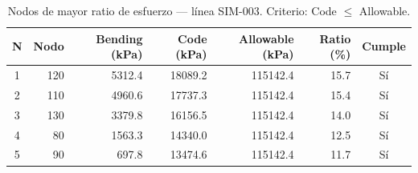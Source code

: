 \begin{table}[htbp]
  \centering
  \small
  \caption{Nodos de mayor ratio de esfuerzo — línea SIM-003. Criterio: Code $\leq$ Allowable.}
  \label{tab:top5-ratio}
  \begin{tabular}{crrrrrc}
    \toprule
    N & Nodo & Bending (\si{kPa}) & Code (\si{kPa}) & Allowable (\si{kPa}) & Ratio (\%) & Cumple \\
    \midrule
    1 & 120 & \num{5312.4} & \num{18089.2} & \num{115142.4} & 15.7 & Sí \\
    2 & 110 & \num{4960.6} & \num{17737.3} & \num{115142.4} & 15.4 & Sí \\
    3 & 130 & \num{3379.8} & \num{16156.5} & \num{115142.4} & 14.0 & Sí \\
    4 & 80 & \num{1563.3} & \num{14340.0} & \num{115142.4} & 12.5 & Sí \\
    5 & 90 & \num{697.8} & \num{13474.6} & \num{115142.4} & 11.7 & Sí \\
    \bottomrule
  \end{tabular}
\end{table}
